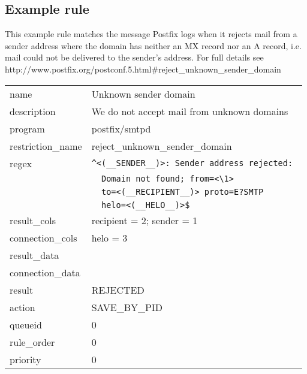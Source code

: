 \documentclass[a4paper,12pt,draft]{article}
\begin{document}
\subsection{Example rule}

This example rule matches the message Postfix logs when it rejects mail
from a sender address where the domain has neither an MX record nor an A
record, i.e. mail could not be delivered to the sender's address.  
For full details see
http://www.postfix.org/postconf.5.html\#reject\_unknown\_sender\_domain


\begin{tabular}[]{ll}

name                & Unknown sender domain                             \\
description         & We do not accept mail from unknown domains        \\
program             & postfix/smtpd                                     \\
restriction\_name   & reject\_unknown\_sender\_domain                   \\
regex               & \verb!^<(__SENDER__)>: Sender address rejected: ! \\
                    & \verb!  Domain not found; from=<\1> !             \\
                    & \verb!  to=<(__RECIPIENT__)> proto=E?SMTP !       \\
                    & \verb!  helo=<(__HELO__)>$!                       \\
result\_cols        & recipient = 2; sender = 1                         \\
connection\_cols    & helo = 3                                          \\
result\_data        &                                                   \\
connection\_data    &                                                   \\
result              & REJECTED                                          \\
action              & SAVE\_BY\_PID                                     \\
queueid             & 0                                                 \\
rule\_order         & 0                                                 \\
priority            & 0                                                 \\

\end{tabular}
\end{document}
